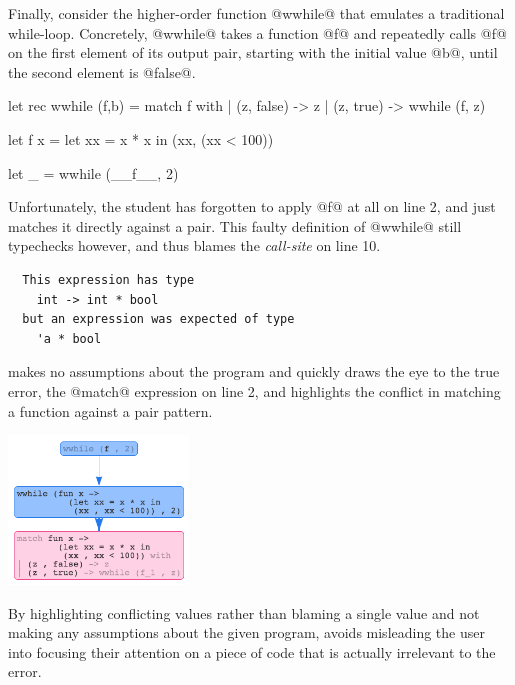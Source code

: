 Finally, consider the higher-order function @wwhile@ that emulates a
traditional while-loop. Concretely, @wwhile@ takes a function @f@ and
repeatedly calls @f@ on the first element of its output pair, starting
with the initial value @b@, until the second element is @false@.
%
\begin{ecode}
  let rec wwhile (f,b) =
    match f with
    | (z, false) -> z
    | (z, true)  -> wwhile (f, z)

  let f x =
    let xx = x * x in
    (xx, (xx < 100))

  let _ = wwhile (__f__, 2)
\end{ecode}
%
Unfortunately, the student has forgotten to apply @f@ at all on line 2,
and just matches it directly against a pair. This faulty definition of
@wwhile@ still typechecks however, and \ocaml thus blames the
\emph{call-site} on line 10.
%
\begin{verbatim}
  This expression has type
    int -> int * bool
  but an expression was expected of type
    'a * bool
\end{verbatim}
%
\toolname makes no assumptions about the program and quickly draws the
eye to the true error, the @match@ expression on line 2, and highlights
the conflict in matching a function against a pair pattern.
%
\begin{center}
  \includegraphics[height=150px]{wwhile.png}
\end{center}
%

By highlighting conflicting values rather than blaming a single value
and not making any assumptions about the given program, \toolname avoids
misleading the user into focusing their attention on a piece of code
that is actually irrelevant to the error.











